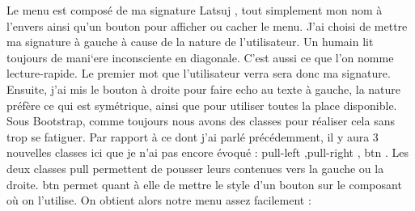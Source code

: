 \documentclass{article}
\begin{document}
Le menu est compos\'e de ma signature \og Latsuj \fg{}, tout simplement mon nom \`a l'envers ainsi qu'un bouton pour afficher ou cacher le menu. J'ai choisi de mettre ma signature \`a gauche \`a cause de la nature de l'utilisateur. Un humain lit toujours de mani`ere inconsciente en diagonale. C'est aussi ce que l'on nomme lecture-rapide. Le premier mot que l'utilisateur verra sera donc ma signature. Ensuite, j'ai mis le bouton \`a droite pour faire echo au texte \`a gauche, la nature pr\'ef\`ere ce qui est sym\'etrique, ainsi que pour utiliser toutes la place disponible. Sous Bootstrap, comme toujours nous avons des classes pour r\'ealiser cela sans trop se fatiguer. Par rapport \`a ce dont j'ai parl\'e pr\'ec\'edemment, il y aura 3 nouvelles classes ici que je n'ai pas encore \'evoqu\'e : \og pull-left \fg{},\og pull-right \fg{}, \og btn \fg{}. Les deux classes \og pull \fg{} permettent de pousser leurs contenues vers la gauche ou la droite. \og btn \fg{} permet quant \`a elle de mettre le style d'un bouton sur le composant o\`u on l'utilise. On obtient alors notre menu assez facilement :
\vspace{0.5cm}\\
\end{document}
